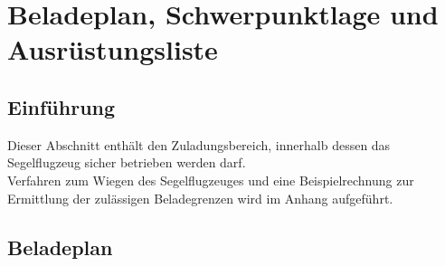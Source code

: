 \chapter{Beladeplan, Schwerpunktlage und Ausrüstungsliste}
\section{Einführung}
Dieser Abschnitt enthält den Zuladungsbereich, innerhalb dessen das Segelflugzeug sicher betrieben werden darf.\\
Verfahren zum Wiegen des Segelflugzeuges und eine Beispielrechnung zur Ermittlung der zulässigen Beladegrenzen wird im Anhang aufgeführt.
\section{Beladeplan}


%
%
